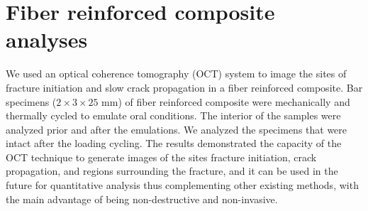 \documentclass[12pt,twoside,english]{book}
\renewcommand{\~}{\perispomeni}%
\numberwithin{equation}{section}
\numberwithin{figure}{section}
\begin{document}
\section{Fiber reinforced composite analyses}
\label{section:Fiber reinforeced composite analyses}

We used an optical coherence tomography (OCT) system to image the sites of fracture initiation and slow crack propagation in a fiber reinforced composite. Bar specimens ($2\times3\times25$ mm) of fiber reinforced composite were mechanically and thermally cycled to emulate oral conditions. The interior of the samples were analyzed prior and after the emulations. We analyzed the specimens that were intact after the loading cycling. The results demonstrated the capacity of the OCT technique to generate images of the sites fracture initiation, crack propagation, and regions surrounding the fracture, and it can be used in the future for quantitative analysis thus complementing other existing methods, with the main advantage of being non-destructive and non-invasive.



\end{document}
